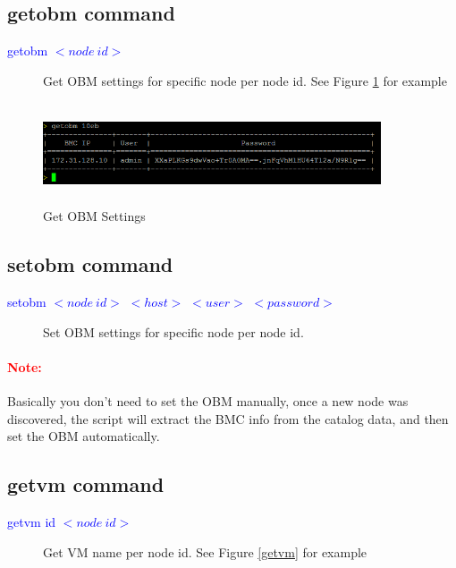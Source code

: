 \documentclass [12pt, a4paper, titlepage]{article}
\begin{document}
\subsection{getobm command} 
        \begin{description}
            \item[\textcolor{blue}{getobm $<node\ id>$}] Get OBM settings for specific node per node id. See Figure \ref{getobm} for example
        \end{description}
        \begin{figure}[H]
        \begin{center}
        \includegraphics[width=10cm,height=3cm]{png/getobm.png}
        \end{center}
        \caption{Get OBM Settings}
        \label{getobm}
        \end{figure}

\subsection{setobm command} 
        \begin{description}
            \item[\textcolor{blue}{setobm $<node\ id>$ $<host>$ $<user>$ $<password>$}] Set OBM settings for specific node per node id. 
        \end{description}

        \paragraph[ident]{\textcolor{red}{Note:}} Basically you don't need to set the OBM manually, once a new node was discovered, the script will extract the BMC info from the catalog data, and then set the OBM automatically.

\subsection{getvm command}
        \begin{description}
            \item[\textcolor{blue}{getvm id $<node\ id>$}] Get VM name per node id. See Figure \ref{getvm} for example
        \end{description}
\end{document}
